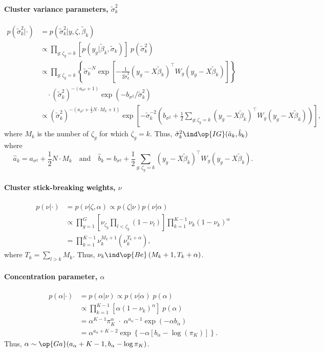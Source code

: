 \paragraph{Cluster variance parameters, $\tilde{\sigma}^2_k$}
\begin{align*}
p(\tilde{\sigma}^2_k|\cdot) & = p(\tilde{\sigma}^2_k|y, \zeta, \tilde{\beta}_k) \\
& \propto \prod_{g:\zeta_g=k} \left[ p(y_g|\tilde{\beta}_k, \tilde{\sigma}_k)\right]\; p(\tilde{\sigma}^2_k)\\
& \propto \prod_{g:\zeta_g=k}  \left\{ \tilde{\sigma}_k^{-N} \exp \left[ -\frac{1}{2\tilde{\sigma}^2_k} \left( y_g - X\tilde{\beta}_k \right)^\top W_g \left( y_g - X\tilde{\beta}_k \right) \right]\right\}\\
& \quad \cdot (\tilde{\sigma}_k^2)^{-(a_{\sigma^2}+1)} \exp\left(-b_{\sigma^2}/\tilde{\sigma}^2_k\right)\\
& \propto (\tilde{\sigma}_k^2)^{-(a_{\sigma^2} + \frac{1}{2}N\cdot M_k + 1)} \exp \left[ -\tilde{\sigma}_k^{-2} \left( b_{\sigma^2} + \frac{1}{2} \sum_{g:\zeta_g=k} \left( y_g - X\tilde{\beta}_k \right)^\top W_g \left( y_g - X\tilde{\beta}_k \right) \right) \right],
\end{align*}
where $M_k$ is the number of $\zeta_g$ for which $\zeta_g=k$.
Thus, $\tilde{\sigma}^2_k \ind \op{IG}(\hat{a}_k, \hat{b}_k)$ where
\begin{equation*}
\hat{a}_k=a_{\sigma^2} + \frac{1}{2}N\cdot M_k \quad \mbox{and} \quad \hat{b}_k=b_{\sigma^2} + \frac{1}{2} \sum_{g:\zeta_g=k} \left( y_g - X\tilde{\beta}_k \right)^\top W_g \left( y_g - X\tilde{\beta}_k \right).
\end{equation*}

\paragraph{Cluster stick-breaking weights, $\nu$}
\begin{align*}
p(\nu|\cdot) & = p(\nu|\zeta,\alpha) \propto p(\zeta|\nu) p(\nu|\alpha)\\
& \propto \prod_{g=1}^G \left[ \nu_{\zeta_g} \prod_{l<\zeta_g}(1-\nu_l) \right] \prod_{k=1}^{K-1} \nu_k(1-\nu_k)^\alpha\\
& = \prod_{k=1}^{K-1} \nu_k^{M_k+1}(\nu_k^{T_k+\alpha}),
\end{align*}
where $T_k = \sum_{l>k}M_k$.
Thus, $\nu_k \ind \op{Be}\left(M_k+1, T_k+\alpha\right)$.

\paragraph{Concentration parameter, $\alpha$}
\begin{align*}
p(\alpha|\cdot) & = p(\alpha|\nu) \propto p(\nu|\alpha)\;p(\alpha)\\
& \propto \prod_{k=1}^{K-1} \left[\alpha (1-\nu_k)^\alpha \right]\;p(\alpha)\\
& = \alpha^{K-1} \pi_K^\alpha\; \cdot \; \alpha^{a_\alpha - 1} \exp(-\alpha b_\alpha)\\
& = \alpha^{a_\alpha + K - 2} \exp\left\{-\alpha \left[ b_\alpha - \log(\pi_K)\right]\right\}. 
\end{align*}
Thus, $\alpha \sim \op{Ga}(a_\alpha + K - 1, b_\alpha - \log \pi_K)$.